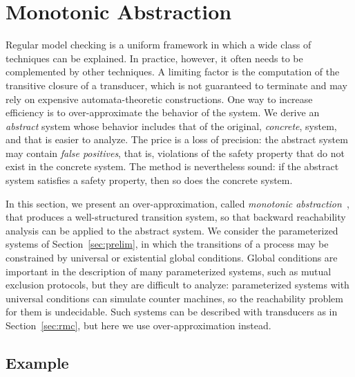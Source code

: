 \section{Monotonic Abstraction}
\label{sec:monotonic}

Regular model checking is a uniform framework in which a wide class of
techniques can be explained. In practice, however, it often needs to be
complemented by other techniques. A limiting factor is the computation of the
transitive closure of a transducer, which is not guaranteed to terminate and
may rely on expensive automata-theoretic constructions. One way to increase
efficiency is to over-approximate the behavior of the system. We derive an
\emph{abstract} system whose behavior includes that of the original,
\emph{concrete}, system, and that is easier to analyze. The price is a loss of
precision: the abstract system may contain \emph{false positives}, that is,
violations of the safety property that do not exist in the concrete system.
The method is nevertheless sound: if the abstract system satisfies a safety
property, then so does the concrete system.

In this section, we present an over-approximation, called \emph{monotonic
abstraction}~\cite{ADHR07,ABDR08}, that produces a well-structured transition
system, so
that backward reachability analysis can be applied
to the abstract system. We consider the parameterized systems of
Section~\ref{sec:prelim}, in which the transitions of a process may be
constrained by universal or existential global conditions. Global conditions are important in the description of
many parameterized systems, such as mutual exclusion protocols, but they are
difficult to analyze: parameterized systems with universal conditions can
simulate counter machines, so the reachability problem for them is
undecidable. Such systems can be described with transducers as in
Section~\ref{sec:rmc}, but here we use over-approximation instead.

\subsection{Example}
\label{sec:mutex}

